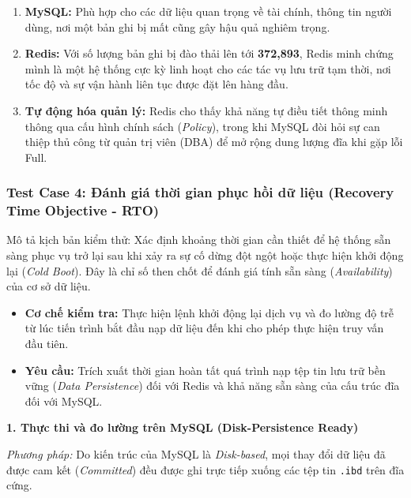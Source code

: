 \begin{enumerate}
\item \textbf{MySQL:} Phù hợp cho các dữ liệu quan trọng về tài chính, thông tin người dùng, nơi một bản ghi bị mất cũng gây hậu quả nghiêm trọng.
\item \textbf{Redis:} Với số lượng bản ghi bị đào thải lên tới \textbf{372,893}, Redis minh chứng mình là một hệ thống cực kỳ linh hoạt cho các tác vụ lưu trữ tạm thời, nơi tốc độ và sự vận hành liên tục được đặt lên hàng đầu.
\item \textbf{Tự động hóa quản lý:} Redis cho thấy khả năng tự điều tiết thông minh thông qua cấu hình chính sách (\textit{Policy}), trong khi MySQL đòi hỏi sự can thiệp thủ công từ quản trị viên (DBA) để mở rộng dung lượng đĩa khi gặp lỗi Full.
\end{enumerate}

\subsubsection{Test Case 4: Đánh giá thời gian phục hồi dữ liệu (Recovery Time Objective - RTO)}

\leavevmode\par
\vspace{0.5em}

\noindent Mô tả kịch bản kiểm thử: Xác định khoảng thời gian cần thiết để hệ thống sẵn sàng phục vụ trở lại sau khi xảy ra sự cố dừng đột ngột hoặc thực hiện khởi động lại (\textit{Cold Boot}). Đây là chỉ số then chốt để đánh giá tính sẵn sàng (\textit{Availability}) của cơ sở dữ liệu.

\begin{itemize}
\item \textbf{Cơ chế kiểm tra:} Thực hiện lệnh khởi động lại dịch vụ và đo lường độ trễ từ lúc tiến trình bắt đầu nạp dữ liệu đến khi cho phép thực hiện truy vấn đầu tiên.
\item \textbf{Yêu cầu:} Trích xuất thời gian hoàn tất quá trình nạp tệp tin lưu trữ bền vững (\textit{Data Persistence}) đối với Redis và khả năng sẵn sàng của cấu trúc đĩa đối với MySQL.
\end{itemize}

\vspace{0.5em}

\noindent\textbf{1. Thực thi và đo lường trên MySQL (Disk-Persistence Ready)}

\textit{Phương pháp:} Do kiến trúc của MySQL là \textit{Disk-based}, mọi thay đổi dữ liệu đã được cam kết (\textit{Committed}) đều được ghi trực tiếp xuống các tệp tin \texttt{.ibd} trên đĩa cứng.


